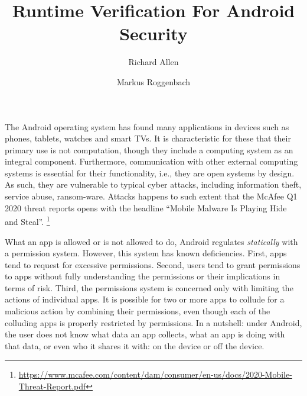 \documentclass[runningheads]{llncs}
\begin{document}
%
\title{Runtime Verification For Android Security}
%
%
\author{Richard Allen \and
Markus Roggenbach}
%
%


%
\maketitle              %
%
%
%
%
%
%
%

The Android operating system has found many applications in devices
such as phones, tablets, watches and smart TVs. It is characteristic
for these that their primary use is not computation, though they
include a computing system as an integral component. Furthermore,
communication with other external computing systems is essential for
their functionality, i.e., they are open systems by design. As such,
they are vulnerable to typical cyber attacks, including information
theft, service abuse, ransom-ware. Attacks happens to such extent that
the McAfee Q1 2020 threat reports opens with the headline ``Mobile
Malware Is Playing Hide and Steal''.
\footnote{\scriptsize\url{https://www.mcafee.com/content/dam/consumer/en-us/docs/2020-Mobile-Threat-Report.pdf}}

What an app is allowed or is not allowed to do, Android regulates
\emph{statically} with a permission system. However, this system has
known deficiencies. First, apps tend to request for excessive
permissions. Second, users tend to grant permissions to apps without
fully understanding the permissions or their implications in terms of
risk. Third, the permissions system is concerned only with limiting
the actions of individual apps. It is possible for two or more apps to
collude for a malicious action by combining their permissions, even
though each of the colluding apps is properly restricted by
permissions. In a nutshell: under Android, the user does not know what
data an app collects, what an app is doing with that data, or even who
it shares it with: on the device or off the device.
\end{document}
